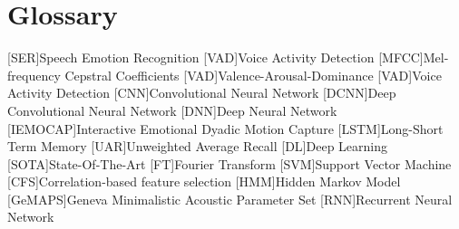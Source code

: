 \chapter{Glossary}

\footnotesize
\SingleSpacing

\begin{multicols}{2}
\begin{acronym}[AAAAAA]

    [SER]{Speech Emotion Recognition}
    [VAD]{Voice Activity Detection}
    [MFCC]{Mel-frequency Cepstral Coefficients}
    [VAD]{Valence-Arousal-Dominance}
    [VAD]{Voice Activity Detection}
    [CNN]{Convolutional Neural Network}
    [DCNN]{Deep Convolutional Neural Network}
    [DNN]{Deep Neural Network}
    [IEMOCAP]{Interactive Emotional Dyadic Motion Capture}
    [LSTM]{Long-Short Term Memory}
    [UAR]{Unweighted Average Recall}
    [DL]{Deep Learning}
    [SOTA]{State-Of-The-Art}
    [FT]{Fourier Transform}
    [SVM]{Support Vector Machine}
    [CFS]{Correlation-based feature selection}
    [HMM]{Hidden Markov Model}
    [GeMAPS]{Geneva Minimalistic Acoustic Parameter Set}
    [RNN]{Recurrent Neural Network}
\end{acronym}
\end{multicols}

